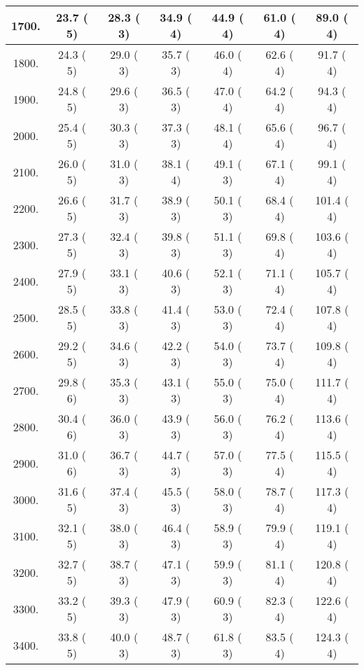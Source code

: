 \begin{tabular}{|c||c|c|c|c|c|c|}
\hline
 1700. &    23.7 (      5) &    28.3 (      3) &    34.9 (      4) &    44.9 (      4) &    61.0 (      4) &    89.0 (      4)\tabularnewline
\hline
 1800. &    24.3 (      5) &    29.0 (      3) &    35.7 (      3) &    46.0 (      4) &    62.6 (      4) &    91.7 (      4)\tabularnewline
\hline
 1900. &    24.8 (      5) &    29.6 (      3) &    36.5 (      3) &    47.0 (      4) &    64.2 (      4) &    94.3 (      4)\tabularnewline
\hline
 2000. &    25.4 (      5) &    30.3 (      3) &    37.3 (      3) &    48.1 (      4) &    65.6 (      4) &    96.7 (      4)\tabularnewline
\hline
 2100. &    26.0 (      5) &    31.0 (      3) &    38.1 (      4) &    49.1 (      3) &    67.1 (      4) &    99.1 (      4)\tabularnewline
\hline
 2200. &    26.6 (      5) &    31.7 (      3) &    38.9 (      3) &    50.1 (      3) &    68.4 (      4) &   101.4 (      4)\tabularnewline
\hline
 2300. &    27.3 (      5) &    32.4 (      3) &    39.8 (      3) &    51.1 (      3) &    69.8 (      4) &   103.6 (      4)\tabularnewline
\hline
 2400. &    27.9 (      5) &    33.1 (      3) &    40.6 (      3) &    52.1 (      3) &    71.1 (      4) &   105.7 (      4)\tabularnewline
\hline
 2500. &    28.5 (      5) &    33.8 (      3) &    41.4 (      3) &    53.0 (      3) &    72.4 (      4) &   107.8 (      4)\tabularnewline
\hline
 2600. &    29.2 (      5) &    34.6 (      3) &    42.2 (      3) &    54.0 (      3) &    73.7 (      4) &   109.8 (      4)\tabularnewline
\hline
 2700. &    29.8 (      6) &    35.3 (      3) &    43.1 (      3) &    55.0 (      3) &    75.0 (      4) &   111.7 (      4)\tabularnewline
\hline
 2800. &    30.4 (      6) &    36.0 (      3) &    43.9 (      3) &    56.0 (      3) &    76.2 (      4) &   113.6 (      4)\tabularnewline
\hline
 2900. &    31.0 (      6) &    36.7 (      3) &    44.7 (      3) &    57.0 (      3) &    77.5 (      4) &   115.5 (      4)\tabularnewline
\hline
 3000. &    31.6 (      5) &    37.4 (      3) &    45.5 (      3) &    58.0 (      3) &    78.7 (      4) &   117.3 (      4)\tabularnewline
\hline
 3100. &    32.1 (      5) &    38.0 (      3) &    46.4 (      3) &    58.9 (      3) &    79.9 (      4) &   119.1 (      4)\tabularnewline
\hline
 3200. &    32.7 (      5) &    38.7 (      3) &    47.1 (      3) &    59.9 (      3) &    81.1 (      4) &   120.8 (      4)\tabularnewline
\hline
 3300. &    33.2 (      5) &    39.3 (      3) &    47.9 (      3) &    60.9 (      3) &    82.3 (      4) &   122.6 (      4)\tabularnewline
\hline
 3400. &    33.8 (      5) &    40.0 (      3) &    48.7 (      3) &    61.8 (      3) &    83.5 (      4) &   124.3 (      4)\tabularnewline

\end{tabular}
